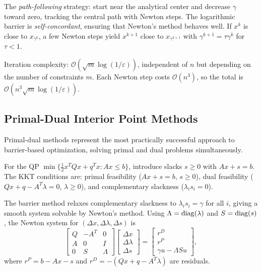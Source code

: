 The \textit{path-following} strategy: start near the analytical center and decrease $\gamma$ toward zero, tracking the central path with Newton steps.
The logarithmic barrier is \textit{self-concordant}, ensuring that Newton's method behaves well.
If $x^k$ is close to $x_{\gamma^k}$, a few Newton steps yield $x^{k+1}$ close to $x_{\gamma^{k+1}}$ with $\gamma^{k+1} = \tau \gamma^k$ for $\tau < 1$.

Iteration complexity: $\mathcal{O}(\sqrt{m}\log(1/\varepsilon))$, independent of $n$ but depending on the number of constraints $m$.
Each Newton step costs $\mathcal{O}(n^3)$, so the total is $\mathcal{O}(n^3 \sqrt{m}\log(1/\varepsilon))$.


\subsection{Primal-Dual Interior Point Methods}\label{ssec:ipm}

Primal-dual methods represent the most practically successful approach to barrier-based optimization, solving primal and dual problems simultaneously.

For the QP $\min\{\frac{1}{2} x^T Q x + q^T x : Ax \leq b\}$, introduce slacks $s \geq 0$ with $Ax + s = b$.
The KKT conditions are: primal feasibility ($Ax + s = b$, $s \geq 0$), dual feasibility ($Qx + q - A^T\lambda = 0$, $\lambda \geq 0$), and complementary slackness ($\lambda_i s_i = 0$).

The barrier method relaxes complementary slackness to $\lambda_i s_i = \gamma$ for all $i$, giving a smooth system solvable by Newton's method.
Using $\Lambda = \operatorname{diag}(\lambda)$ and $S = \operatorname{diag}(s)$, the Newton system for $(\Delta x, \Delta\lambda, \Delta s)$ is
\begin{equation}\label{eq:ipm-newton}
	\begin{bmatrix} Q & -A^T & 0 \\ A & 0 & I \\ 0 & S & \Lambda \end{bmatrix}
	\begin{bmatrix} \Delta x \\ \Delta\lambda \\ \Delta s \end{bmatrix}
	= \begin{bmatrix} r^D \\ r^P \\ \gamma u - \Lambda S u \end{bmatrix},
\end{equation}
where $r^P = b - Ax - s$ and $r^D = -(Qx + q - A^T\lambda)$ are residuals.


